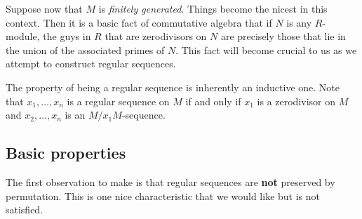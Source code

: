 \documentclass{article}
\begin{document}
Suppose now that $M$ is \emph{finitely generated}. Things become the nicest
in this context. Then it is  a basic fact of commutative algebra that if $N$ is
any $R$-module, the guys in $R$ that are zerodivisors on $N$ are precisely
those that lie in the union of the associated primes of $N$. 
This fact will become crucial to us as we attempt to construct regular
sequences.


The property of being a regular sequence is inherently an inductive one. Note
that $x_1, \dots, x_n$ is a regular sequence on $M$ if and only if $x_1$ is a
zerodivisor on $M$ and $x_2, \dots, x_n$ is an $M/x_1 M$-sequence.

\subsection{Basic properties}

The first observation to make is that regular sequences are \textbf{not}
preserved by permutation. This is one nice characteristic that we would like
but is not satisfied.
\end{document}
